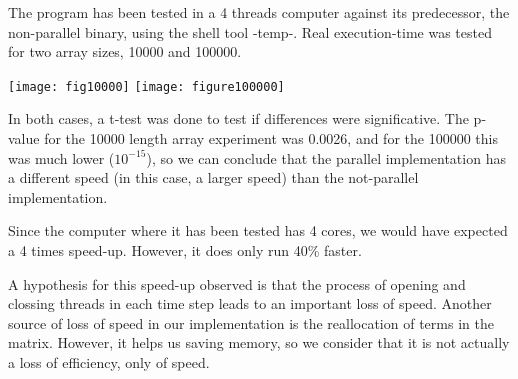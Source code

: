 \documentclass{article}
\begin{document}
	The program has been tested in a 4 threads computer against its predecessor,
	the non-parallel binary, using the shell tool -temp-. Real execution-time
	was tested for two array sizes, 10000 and 100000.

	\texttt{[image: fig10000]}
	\texttt{[image: figure100000]}

	In both cases, a t-test was done to test if differences were significative.
	The p-value for the 10000 length array experiment was 0.0026, and for the
	100000 this was much lower ($10^{-15}$), so we can conclude that
	the parallel implementation has a different speed (in this case, a
	larger speed) than the not-parallel implementation.

	Since the computer where it has been tested has 4 cores, we would have
	expected a 4 times speed-up. However, it does only run 40\% faster.

	A hypothesis for this speed-up observed is that the process of opening and
	clossing threads in each time step leads to an important loss of
	speed. Another source of loss of speed in our implementation is the
	reallocation of terms in the matrix. However, it helps us saving memory,
	so we consider that it is not actually a loss of efficiency, only of speed.
\end{document}
